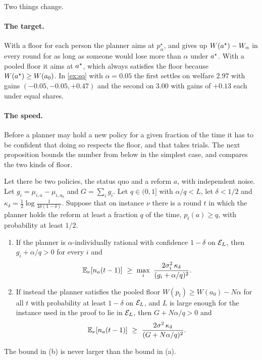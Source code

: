Two things change.

\paragraph{The target.} With a floor for each person the planner aims at $p^\star_\alpha$, and gives up $W(a^\star)-W_\alpha$ in every round for as long as someone would lose more than $\alpha$ under $a^\star$. With a pooled floor it aims at $a^\star$, which always satisfies the floor because $W(a^\star)\ge W(a_0)$. In \cref{ex:sq} with $\alpha=0.05$ the first settles on welfare $2.97$ with gains $(-0.05,-0.05,+0.47)$ and the second on $3.00$ with gains of $+0.13$ each under equal shares.

\paragraph{The speed.} Before a planner may hold a new policy for a given fraction of the time it has to be confident that doing so respects the floor, and that takes trials. The next proposition bounds the number from below in the simplest case, and compares the two kinds of floor.

\begin{proposition}\label{prop:certify}
Let there be two policies, the status quo and a reform $a$, with independent noise. Let $g_i=\mu_{i,a}-\mu_{i,a_0}$ and $G=\sum_ig_i$. Let $q\in(0,1]$ with $\alpha/q<L$, let $\delta<1/2$ and $\kappa_\delta=\tfrac12\log\frac{1}{4\delta(1-\delta)}$. Suppose that on instance $\nu$ there is a round $t$ in which the planner holds the reform at least a fraction $q$ of the time, $p_t(a)\ge q$, with probability at least $1/2$.
\begin{enumerate}[leftmargin=*,itemsep=1pt,label=(\alph*)]
  \item If the planner is $\alpha$-individually rational with confidence $1-\delta$ on $\mathcal{E}_L$, then $g_i+\alpha/q>0$ for every $i$ and
  \[
    \E_\nu[n_a(t-1)]\ \ge\ \max_i\ \frac{2\sigma_i^2\,\kappa_\delta}{(g_i+\alpha/q)^2}.
  \]
  \item If instead the planner satisfies the pooled floor $W(p_t)\ge W(a_0)-N\alpha$ for all $t$ with probability at least $1-\delta$ on $\mathcal{E}_L$, and $L$ is large enough for the instance used in the proof to lie in $\mathcal{E}_L$, then $G+N\alpha/q>0$ and
  \[
    \E_\nu[n_a(t-1)]\ \ge\ \frac{2\sigma^2\,\kappa_\delta}{(G+N\alpha/q)^2}.
  \]
\end{enumerate}
The bound in (b) is never larger than the bound in (a).
\end{proposition}

